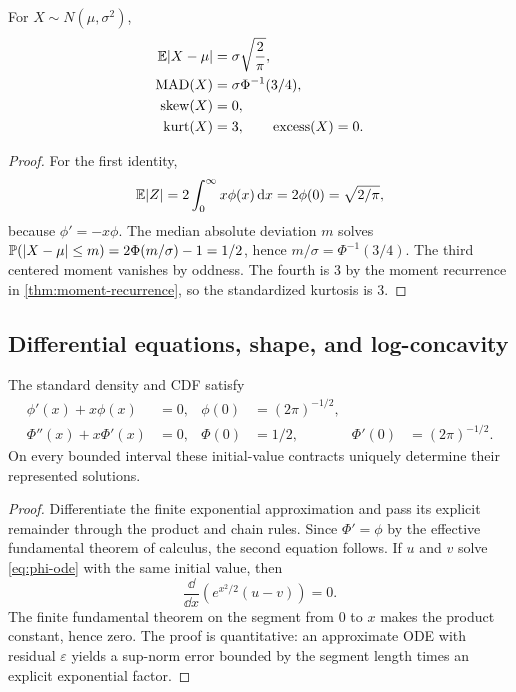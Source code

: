 \begin{corollary}\label{cor:shape-statistics}
For $X\sim N(\mu,\sigma^2)$,
\begin{align*}
 \mathbb E|X-\mu|&=\sigma\sqrt{\frac2\pi},\\
 \operatorname{MAD}(X)&=\sigma\Phi^{-1}(3/4),\\
 \operatorname{skew}(X)&=0,\\
 \operatorname{kurt}(X)&=3,
 \qquad \operatorname{excess}(X)=0.
\end{align*}
\end{corollary}

\begin{proof}
For the first identity,
\[
 \mathbb E|Z|=2\int_0^\infty x\phi(x)\,\mathrm d x
 =2\phi(0)=\sqrt{2/\pi},
\]
because $\phi'=-x\phi$.  The median absolute deviation $m$ solves
$\mathbb P(|X-\mu|\le m)=2\Phi(m/\sigma)-1=1/2$, hence $m/\sigma=\Phi^{-1}(3/4)$.  The third centered moment vanishes by oddness.  The fourth is $3$ by the moment recurrence in \cref{thm:moment-recurrence}, so the standardized kurtosis is $3$.
\end{proof}

\subsection{Differential equations, shape, and log-concavity}

\begin{proposition}\label{prop:gaussian-odes}
The standard density and CDF satisfy
\begin{align}
 \phi'(x)+x\phi(x)&=0, & \phi(0)&=(2\pi)^{-1/2},\label{eq:phi-ode}\\
 \Phi''(x)+x\Phi'(x)&=0, & \Phi(0)&=1/2,
 &\Phi'(0)&=(2\pi)^{-1/2}.
\end{align}
On every bounded interval these initial-value contracts uniquely determine their represented solutions.
\end{proposition}

\begin{proof}
Differentiate the finite exponential approximation and pass its explicit remainder through the product and chain rules.  Since $\Phi'=\phi$ by the effective fundamental theorem of calculus, the second equation follows.  If $u$ and $v$ solve \eqref{eq:phi-ode} with the same initial value, then
\[
 \frac{\dd}{\dd x}\left(e^{x^2/2}(u-v)\right)=0.
\]
The finite fundamental theorem on the segment from $0$ to $x$ makes the product constant, hence zero.  The proof is quantitative: an approximate ODE with residual $\varepsilon$ yields a sup-norm error bounded by the segment length times an explicit exponential factor.
\end{proof}

